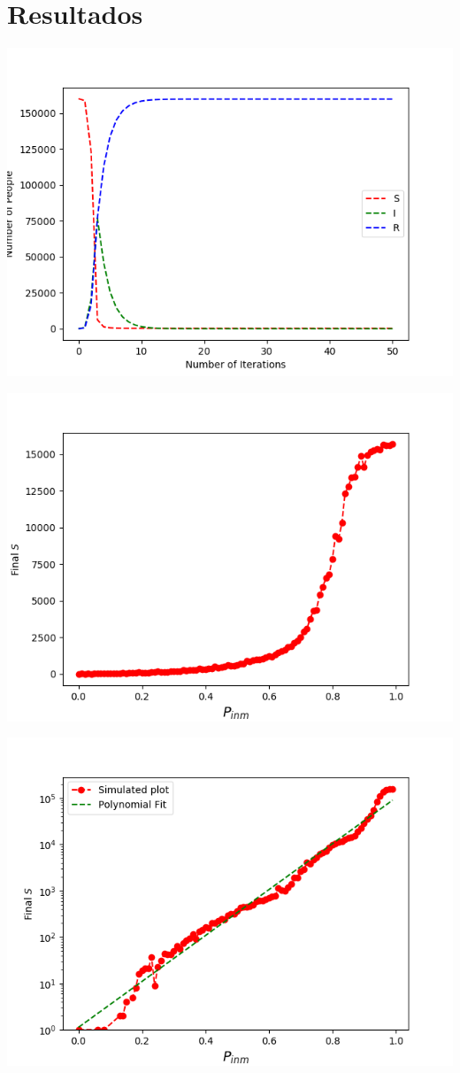 \documentclass{beamer}
\begin{document}
\section{Resultados}
\begin{frame}
\begin{center}
\includegraphics[width=.8\textwidth]{../article/IterationsVSNumber}
\end{center}
\end{frame}	

\begin{frame}
\begin{center}
\includegraphics[width=.8\textwidth]{../article/PinmVSs}
\end{center}
\end{frame}

\begin{frame}
\begin{center}
\includegraphics[width=.8\textwidth]{../article/PinmVSsSemilog}
\end{center}
\end{frame}
\end{document}
